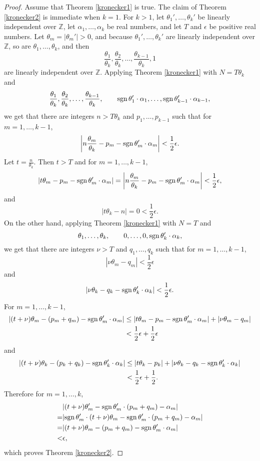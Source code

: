 \documentclass{article}
\newcommand{\sgn}{\ensuremath\mathrm{sgn}\,}
\theoremstyle{definition}
\begin{document}
\begin{proof}
Assume that Theorem \ref{kronecker1} is true. 
The claim of Theorem \ref{kronecker2} is immediate when $k=1$. For $k>1$, let $\theta_1',\ldots,\theta_k'$ be linearly independent over
$\mathbb{Z}$, let $\alpha_1,\ldots,\alpha_k$ be real numbers, and let $T$ and $\epsilon$ be positive real numbers. 
Let $\theta_m=|\theta_m'|>0$, and because $\theta_1',\ldots,\theta_k'$ are linearly independent over $\mathbb{Z}$, so are
$\theta_1,\ldots,\theta_k$, and then 
\[
\frac{\theta_1}{\theta_k},\frac{\theta_2}{\theta_k},\ldots,\frac{\theta_{k-1}}{\theta_k},1
\]
are linearly independent over $\mathbb{Z}$. Applying Theorem \ref{kronecker1} with $N=T\theta_k$ and
\[
\frac{\theta_1}{\theta_k},\frac{\theta_2}{\theta_k},\ldots,\frac{\theta_{k-1}}{\theta_k},
\qquad \sgn \theta_1' \cdot \alpha_1,\ldots, \sgn \theta_{k-1}' \cdot \alpha_{k-1},
\] 
 we get that there are integers $n>T\theta_k$ and $p_1,\ldots,p_{k-1}$ such that  
for $m=1,\ldots,k-1$,
\[
\left|n\frac{\theta_m}{\theta_k} - p_m - \sgn \theta_m' \cdot \alpha_m\right| < \frac{1}{2} \epsilon.
\]
Let $t=\frac{n}{\theta_k}$. Then $t>T$ and for $m=1,\ldots,k-1$,
\[
|t\theta_m - p_m -\sgn \theta_m' \cdot \alpha_m| = 
\left| n \frac{\theta_m}{\theta_k} - p_m - \sgn \theta_m' \cdot \alpha_m \right| < \frac{1}{2}\epsilon,
\]
and
\[
|t\theta_k - n| = 0 <\frac{1}{2} \epsilon. 
\]
On the other hand, applying Theorem \ref{kronecker1} with $N=T$ and 
\[
\theta_1,\ldots,\theta_k,
\qquad 0,\ldots,0,\sgn \theta_k' \cdot \alpha_k,
\] 
we get that there are integers $\nu>T$ and $q_1,\ldots,q_k$ such that 
for $m=1,\ldots,k-1$,
\[
|\nu \theta_m - q_m| < \frac{1}{2}\epsilon
\]
and 
\[
|\nu \theta_k - q_k -\sgn \theta_k' \cdot \alpha_k|<\frac{1}{2}\epsilon.
\]
For $m=1,\ldots,k-1$,
\begin{align*}
|(t+\nu)\theta_m - (p_m+q_m)-\sgn \theta_m' \cdot \alpha_m|&\leq |t\theta_m - p_m -\sgn \theta_m' \cdot \alpha_m| + |\nu \theta_m - q_m|\\
&<\frac{1}{2}\epsilon+\frac{1}{2}\epsilon
\end{align*}
and
\begin{align*}
|(t+\nu)\theta_k - (p_k+q_k) -\sgn \theta_k' \cdot \alpha_k|&\leq |t\theta_k - p_k| + |\nu\theta_k - q_k -\sgn \theta_k' \cdot \alpha_k|\\
&<\frac{1}{2}\epsilon + \frac{1}{2}.
\end{align*}
Therefore for $m=1,\ldots,k$, 
\[
\begin{split}
&|(t+\nu)\theta_m' -  \sgn \theta_m' \cdot (p_m+q_m) - \alpha_m|\\
=&|\sgn \theta_m' \cdot (t+\nu)  \theta_m - \sgn \theta_m' \cdot (p_m+q_m)   -  \alpha_m|\\
=&|(t+\nu)\theta_m  - (p_m+q_m) -  \sgn \theta_m' \cdot \alpha_m|\\
<&\epsilon,
\end{split}
\]
which proves Theorem \ref{kronecker2}.
\end{proof}
\end{document}
